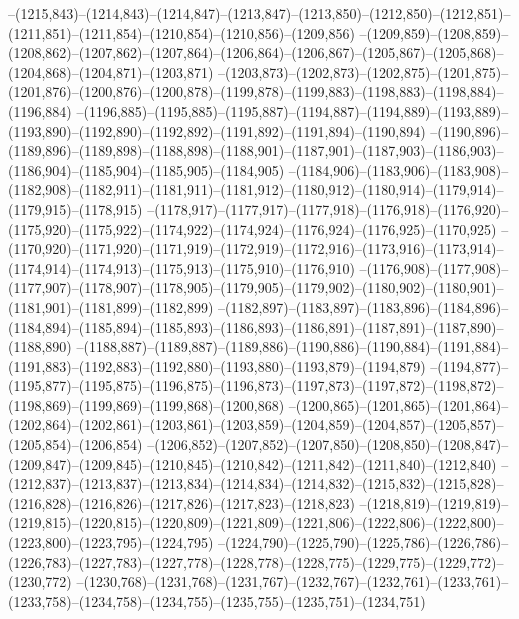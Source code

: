 --(1215,843)--(1214,843)--(1214,847)--(1213,847)--(1213,850)--(1212,850)--(1212,851)--(1211,851)--(1211,854)--(1210,854)--(1210,856)--(1209,856)
--(1209,859)--(1208,859)--(1208,862)--(1207,862)--(1207,864)--(1206,864)--(1206,867)--(1205,867)--(1205,868)--(1204,868)--(1204,871)--(1203,871)
--(1203,873)--(1202,873)--(1202,875)--(1201,875)--(1201,876)--(1200,876)--(1200,878)--(1199,878)--(1199,883)--(1198,883)--(1198,884)--(1196,884)
--(1196,885)--(1195,885)--(1195,887)--(1194,887)--(1194,889)--(1193,889)--(1193,890)--(1192,890)--(1192,892)--(1191,892)--(1191,894)--(1190,894)
--(1190,896)--(1189,896)--(1189,898)--(1188,898)--(1188,901)--(1187,901)--(1187,903)--(1186,903)--(1186,904)--(1185,904)--(1185,905)--(1184,905)
--(1184,906)--(1183,906)--(1183,908)--(1182,908)--(1182,911)--(1181,911)--(1181,912)--(1180,912)--(1180,914)--(1179,914)--(1179,915)--(1178,915)
--(1178,917)--(1177,917)--(1177,918)--(1176,918)--(1176,920)--(1175,920)--(1175,922)--(1174,922)--(1174,924)--(1176,924)--(1176,925)--(1170,925)
--(1170,920)--(1171,920)--(1171,919)--(1172,919)--(1172,916)--(1173,916)--(1173,914)--(1174,914)--(1174,913)--(1175,913)--(1175,910)--(1176,910)
--(1176,908)--(1177,908)--(1177,907)--(1178,907)--(1178,905)--(1179,905)--(1179,902)--(1180,902)--(1180,901)--(1181,901)--(1181,899)--(1182,899)
--(1182,897)--(1183,897)--(1183,896)--(1184,896)--(1184,894)--(1185,894)--(1185,893)--(1186,893)--(1186,891)--(1187,891)--(1187,890)--(1188,890)
--(1188,887)--(1189,887)--(1189,886)--(1190,886)--(1190,884)--(1191,884)--(1191,883)--(1192,883)--(1192,880)--(1193,880)--(1193,879)--(1194,879)
--(1194,877)--(1195,877)--(1195,875)--(1196,875)--(1196,873)--(1197,873)--(1197,872)--(1198,872)--(1198,869)--(1199,869)--(1199,868)--(1200,868)
--(1200,865)--(1201,865)--(1201,864)--(1202,864)--(1202,861)--(1203,861)--(1203,859)--(1204,859)--(1204,857)--(1205,857)--(1205,854)--(1206,854)
--(1206,852)--(1207,852)--(1207,850)--(1208,850)--(1208,847)--(1209,847)--(1209,845)--(1210,845)--(1210,842)--(1211,842)--(1211,840)--(1212,840)
--(1212,837)--(1213,837)--(1213,834)--(1214,834)--(1214,832)--(1215,832)--(1215,828)--(1216,828)--(1216,826)--(1217,826)--(1217,823)--(1218,823)
--(1218,819)--(1219,819)--(1219,815)--(1220,815)--(1220,809)--(1221,809)--(1221,806)--(1222,806)--(1222,800)--(1223,800)--(1223,795)--(1224,795)
--(1224,790)--(1225,790)--(1225,786)--(1226,786)--(1226,783)--(1227,783)--(1227,778)--(1228,778)--(1228,775)--(1229,775)--(1229,772)--(1230,772)
--(1230,768)--(1231,768)--(1231,767)--(1232,767)--(1232,761)--(1233,761)--(1233,758)--(1234,758)--(1234,755)--(1235,755)--(1235,751)--(1234,751)
